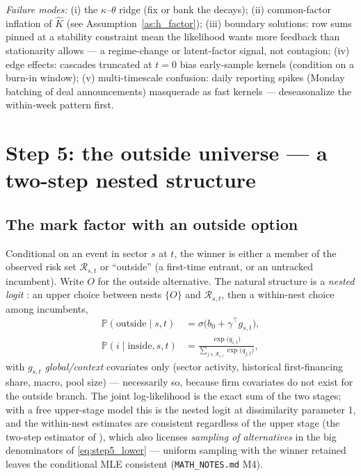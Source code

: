 \documentclass[11pt]{article}
\newcommand{\Prob}{\mathbb{P}}
\newcommand{\cR}{\mathcal{R}}
\newcommand{\code}[1]{\texttt{#1}}
\numberwithin{assumption}{section}
\numberwithin{proposition}{section}
\numberwithin{remark}{section}
\begin{document}
\emph{Failure modes:}
(i) the $\kappa$--$\theta$ ridge (fix or bank the decays);
(ii) common-factor inflation of $\hat K$ (see
Assumption~\ref{as:h_factor});
(iii) boundary solutions: row sums pinned at a stability constraint mean
the likelihood wants more feedback than stationarity allows --- a
regime-change or latent-factor signal, not contagion;
(iv) edge effects: cascades truncated at $t=0$ bias early-sample kernels
(condition on a burn-in window);
(v) multi-timescale confusion: daily reporting spikes (Monday batching of
deal announcements) masquerade as fast kernels --- deseasonalize the
within-week pattern first.

\section{Step 5: the outside universe --- a two-step nested structure}
\label{sec:step5}

\subsection{The mark factor with an outside option}
Conditional on an event in sector $s$ at $t$, the winner is either a member
of the observed risk set $\cR_{s,t}$ or ``outside'' (a first-time entrant,
or an untracked incumbent). Write $O$ for the outside alternative. The
natural structure is a \emph{nested logit} \citep{mcfadden1974,
mcfadden1978}: an upper choice between nests $\{O\}$ and $\cR_{s,t}$, then
a within-nest choice among incumbents,
\begin{align}
\Prob(\text{outside}\mid s,t)
&=\sigma\!\big(b_0+\gamma^\top g_{s,t}\big),
\label{eq:step5_upper}\\[2pt]
\Prob(i\mid \text{inside}, s,t)
&=\frac{\exp\big(q_{i,t}\big)}
{\sum_{j\in\cR_{s,t}}\exp\big(q_{j,t}\big)},
\label{eq:step5_lower}
\end{align}
with $g_{s,t}$ \emph{global/context} covariates only (sector activity,
historical first-financing share, macro, pool size) --- necessarily so,
because firm covariates do not exist for the outside branch. The joint
log-likelihood is the exact sum of the two stages; with a free upper-stage
model this is the nested logit at dissimilarity parameter 1, and the
within-nest estimates are consistent regardless of the upper stage (the
two-step estimator of \citealp{mcfadden1978}), which also licenses
\emph{sampling of alternatives} in the big denominators of
\eqref{eq:step5_lower} --- uniform sampling with the winner retained leaves
the conditional MLE consistent (\code{MATH\_NOTES.md} M4).
\end{document}

